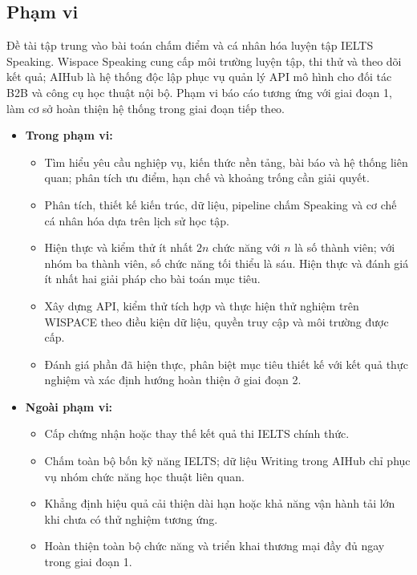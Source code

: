 \subsection{Phạm vi}

\indent Đề tài tập trung vào bài toán chấm điểm và cá nhân hóa luyện tập IELTS Speaking. Wispace Speaking cung cấp môi trường luyện tập, thi thử và theo dõi kết quả; AIHub là hệ thống độc lập phục vụ quản lý API mô hình cho đối tác B2B và công cụ học thuật nội bộ. Phạm vi báo cáo tương ứng với giai đoạn 1, làm cơ sở hoàn thiện hệ thống trong giai đoạn tiếp theo.

\begin{itemize}
    \item \textbf{Trong phạm vi:}
    \begin{itemize}
        \item Tìm hiểu yêu cầu nghiệp vụ, kiến thức nền tảng, bài báo và hệ thống liên quan; phân tích ưu điểm, hạn chế và khoảng trống cần giải quyết.
        \item Phân tích, thiết kế kiến trúc, dữ liệu, pipeline chấm Speaking và cơ chế cá nhân hóa dựa trên lịch sử học tập.
        \item Hiện thực và kiểm thử ít nhất $2n$ chức năng với $n$ là số thành viên; với nhóm ba thành viên, số chức năng tối thiểu là sáu. Hiện thực và đánh giá ít nhất hai giải pháp cho bài toán mục tiêu.
        \item Xây dựng API, kiểm thử tích hợp và thực hiện thử nghiệm trên WISPACE theo điều kiện dữ liệu, quyền truy cập và môi trường được cấp.
        \item Đánh giá phần đã hiện thực, phân biệt mục tiêu thiết kế với kết quả thực nghiệm và xác định hướng hoàn thiện ở giai đoạn 2.
    \end{itemize}

    \item \textbf{Ngoài phạm vi:}
    \begin{itemize}
        \item Cấp chứng nhận hoặc thay thế kết quả thi IELTS chính thức.
        \item Chấm toàn bộ bốn kỹ năng IELTS; dữ liệu Writing trong AIHub chỉ phục vụ nhóm chức năng học thuật liên quan.
        \item Khẳng định hiệu quả cải thiện dài hạn hoặc khả năng vận hành tải lớn khi chưa có thử nghiệm tương ứng.
        \item Hoàn thiện toàn bộ chức năng và triển khai thương mại đầy đủ ngay trong giai đoạn 1.
    \end{itemize}


\end{itemize}
